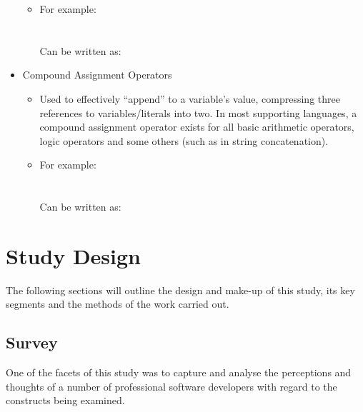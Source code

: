 \documentclass{article}
\begin{document}
\begin{itemize}
\begin{itemize}
                    \item For example:\\
                    \\\\
                    Can be written as:\\
                \end{itemize}
            \item Compound Assignment Operators
                \begin{itemize}
                    \item Used to effectively ``append'' to a variable's value, compressing three references to variables/literals into two. In most supporting languages, a compound assignment operator exists for all basic arithmetic operators, logic operators and some others (such as in string concatenation).
                    \item For example:\\
                    \\\\
                    Can be written as:\\
                \end{itemize}
        \end{itemize}
\newpage
\section{Study Design}
    The following sections will outline the design and make-up of this study, its key segments and the methods of the work carried out.
    \subsection{Survey}
    \label{subsec:survey}
        One of the facets of this study was to capture and analyse the perceptions and thoughts of a number of professional software developers with regard to the constructs being examined.
        
\end{document}
